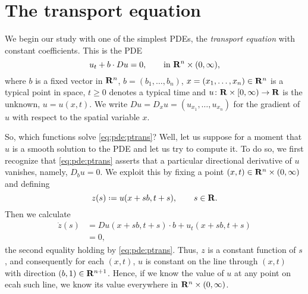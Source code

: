 \section{The transport equation}
We begin our study with one of the simplest PDEs, the \emph{transport
  equation} with constant coefficients. This is the PDE
\begin{equation}
  \label{eq:pde:ptrans}
  u_t+b\cdot Du=0,\qquad \text{in \(\mathbf{R}^n\times(0,\infty)\),}
\end{equation}
where \(b\) is a fixed vector in \(\mathbf{R}^n\), \(b=(b_1,\dotsc,b_n)\),
\(x=(x_1,\dotsc,x_n)\in\mathbf{R}^n\) is a typical point in space, \(t\geq 0\)
denotes a typical time and \(u\colon\mathbf{R}\times[0,\infty)\to\mathbf{R}\) is the
unknown, \(u=u(x,t)\). We write \(Du=D_xu=(u_{x_1},\dotsc,u_{x_n})\) for
the gradient of \(u\) with respect to the spatial variable \(x\).

So, which functions solve \eqref{eq:pde:ptrans}? Well, let us suppose for a
moment that \(u\) is a smooth solution to the PDE and let us try to compute
it. To do so, we first recognize that \eqref{eq:pde:ptrans} asserts that a
particular directional derivative of \(u\) vanishes, namely, \(D_bu=0\). We
exploit this by fixing a point \((x,t)\in\mathbf{R}^n\times(0,\infty)\) and
defining
\[
  z(s)\defeq u(x+sb,t+s),\qquad s\in\bfR.
\]
Then we calculate
\begin{align*}
  \dot z(s)&=Du(x+sb,t+s)\cdot b+u_t(x+sb,t+s)\\
           &=0,
\end{align*}
the second equality holding by \eqref{eq:pde:ptrans}. Thus, \(z\) is a
constant function of \(s\), and consequently for each \((x,t)\), \(u\) is
constant on the line through \((x,t)\) with direction
\((b,1)\in\mathbf{R}^{n+1}\). Hence, if we know the value of \(u\) at any point
on ecah such line, we know its value everywhere in
\(\mathbf{R}^n\times(0,\infty)\).

